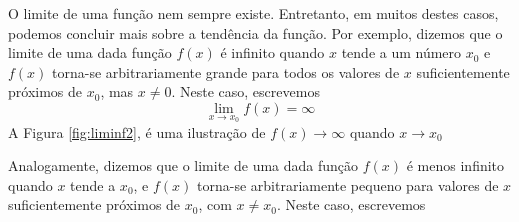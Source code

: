 \cleardoublepage\documentclass[../main.tex]{subfiles}
\begin{document}
\noindent O limite de uma função nem sempre existe. Entretanto, em muitos destes casos, podemos concluir mais sobre a tendência da função. Por exemplo, dizemos que o limite de uma dada função $f(x)$ é infinito quando $x$ tende a um número $x_0$ e $f(x)$ torna-se arbitrariamente grande para todos os valores de $x$ suficientemente próximos de $x_0$, mas $x\neq 0$. Neste caso, escrevemos
\begin{equation*}
  \lim_{x\to x_0} f(x) = \infty
\end{equation*}
A Figura \ref{fig:liminf2}, é uma ilustração de $f(x)\to\infty$ quando $x\to x_0$

Analogamente, dizemos que o limite de uma dada função $f(x)$ é menos infinito quando $x$ tende a $x_0$, e $f(x)$ torna-se arbitrariamente pequeno para valores de $x$ suficientemente próximos de $x_0$, com $x\neq x_0$. Neste caso, escrevemos
\end{document}
